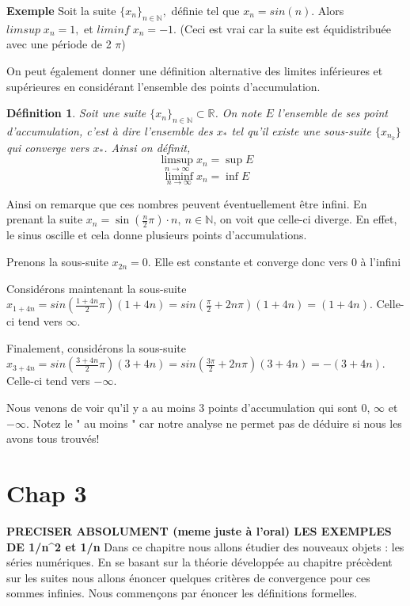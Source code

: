 \documentclass[a4paper, 12pt, french, twoside]{article}
\newtheorem{defi}[theorem]{Définition}
\newcommand{\Nn}{{\mathbb{N}}}
\newcommand{\Rr}{{\mathbb{R}}}
\begin{document}
\textbf{Exemple} Soit la suite $\{x_n\}_{n\in \Nn},$ définie tel que $x_n = sin(n).$ Alors $limsup \; x_n = 1,$ et $liminf \; x_n = -1.$ (Ceci est vrai car la suite est équidistribuée avec une période de 2 $\pi$)

On peut également donner une définition alternative des limites inférieures et supérieures en considérant l'ensemble des points d'accumulation. 
\begin{defi}
    Soit une suite $\{x_n\}_{n\in \Nn}\subset \Rr$. On note $E$ l'ensemble de ses point d'accumulation, c'est à dire l'ensemble des $x_*$ tel qu'il existe une sous-suite $\{x_{n_k}\}$ qui converge vers $x_*$. Ainsi on définit,
        \[
    \limsup_{n \rightarrow \infty} x_n = \sup E
    \]
    \[
    \liminf_{n \rightarrow \infty} x_n = \inf E
    \]
\end{defi}
 Ainsi on remarque que ces nombres peuvent éventuellement être infini. 
En prenant la suite $x_n=\sin(\frac{n}{2}\pi)\cdot n, ~ n\in \Nn$, on voit que celle-ci diverge. En effet, le sinus oscille et cela donne plusieurs points d'accumulations.

Prenons la sous-suite $x_{2n}=0$. Elle est constante et converge donc vers 0 à l'infini

Considérons maintenant la sous-suite $x_{1+4n}=sin(\frac{1+4n}{2}\pi)(1+4n)=sin(\frac{\pi}{2}+2n\pi)(1+4n)=(1+4n)$. Celle-ci tend vers $\infty$. 

Finalement, considérons la sous-suite $x_{3+4n}=sin(\frac{3+4n}{2}\pi)(3+4n)=sin(\frac{3\pi}{2}+2n\pi)(3+4n)=-(3+4n)$. Celle-ci tend vers $-\infty$.

Nous venons de voir qu'il y a au moins 3 points d'accumulation qui sont 0, $\infty$ et $-\infty$. Notez le " au moins " car notre analyse ne permet pas de déduire si nous les avons tous trouvés! 


\section{Chap 3} \textbf{PRECISER ABSOLUMENT (meme juste à l'oral) LES EXEMPLES DE 1/n^2 et 1/n}
Dans ce chapitre nous allons étudier des nouveaux objets : les séries numériques. En se basant sur la théorie développée au chapitre précèdent sur les suites nous allons énoncer quelques critères de convergence pour ces sommes infinies. Nous commençons par énoncer les définitions formelles. 
\end{document}
